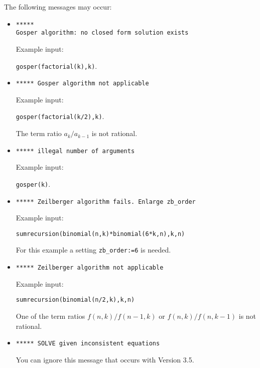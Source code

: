 The following messages may occur:
\begin{itemize}
\item
  \texttt{*****\\
    Gosper algorithm:\ no closed form solution exists}

Example input:

\texttt{gosper(factorial(k),k)}.
\item
\texttt{***** Gosper algorithm not applicable}

Example input:

\texttt{gosper(factorial(k/2),k)}.

The term ratio $a_k/a_{k-1}$ is not rational.
\item
\texttt{***** illegal number of arguments}

Example input:

\texttt{gosper(k)}.
\item
\texttt{***** Zeilberger algorithm fails.\ Enlarge zb\_order}

Example input:

\texttt{sumrecursion(binomial(n,k)*binomial(6*k,n),k,n)}

For  this example a setting \texttt{zb\_order:=6} is needed.
\item
\texttt{***** Zeilberger algorithm not applicable}

Example input:

\texttt{sumrecursion(binomial(n/2,k),k,n)}

One of the term ratios $f(n,k)/f(n-1,k)$ or $f(n,k)/f(n,k-1)$
is not rational.
\item
\texttt{***** SOLVE given inconsistent equations}

You can ignore this message that occurs with Version 3.5.
\end{itemize}
